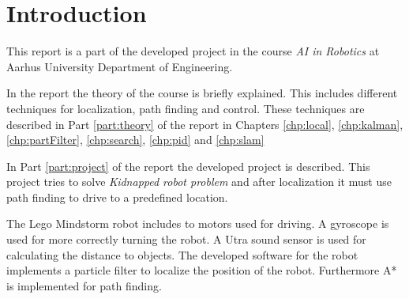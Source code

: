 \chapter{Introduction}
\label{chp:intro}

This report is a part of the developed project in the course \emph{AI in Robotics} at Aarhus University Department of Engineering.

In the report the theory of the course is briefly explained. This includes different techniques for localization, path finding and control. These techniques are described in Part \ref{part:theory} of the report in Chapters \ref{chp:local}, \ref{chp:kalman}, \ref{chp:partFilter}, \ref{chp:search}, \ref{chp:pid} and \ref{chp:slam}

In Part \ref{part:project} of the report the developed project is described. This project tries to solve \emph{Kidnapped robot problem} and after localization it must use path finding to drive to a predefined location.

The Lego Mindstorm robot includes to motors used for driving. A gyroscope is used for more correctly turning the robot. A Utra sound sensor is used for calculating the distance to objects. The developed software for the robot implements a particle filter to localize the position of the robot. Furthermore A* is implemented for path finding.